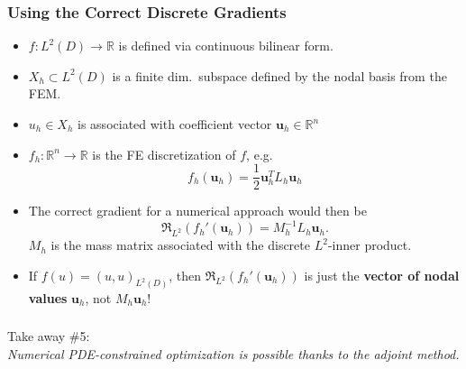 \documentclass[aspectratio=169,xcolor=dvipsnames,10pt]{beamer}
\begin{document}
\begin{frame}\frametitle{Using the Correct Discrete Gradients}
\vspace{-2ex}
\begin{example}[]
\begin{itemize}
\item
$f : L^2(D) \to \mathbb R$  is defined via continuous bilinear form.
\item 
$X_h \subset L^2(D)$ is a finite dim.\ subspace defined by the nodal basis from the FEM. 
\item 
$u_h \in X_h$ is associated with coefficient vector $\mathbf{u}_h \in \mathbb R^n$ \pause
\item 
$f_h : \mathbb R^n \to \mathbb R$ is the FE discretization of $f$, e.g.
\[
f_h(\mathbf{u}_h) = \frac{1}{2} \mathbf{u}^T_h L_h \mathbf{u}_h
\]
\item The correct gradient for a numerical approach would then be
\[
\mathfrak{R}_{L^2}(f_h'(\mathbf{u}_h)) = M_h^{-1} L_h \mathbf{u}_h.
\]
$M_h$ is the mass matrix associated with the discrete $L^2$-inner product.
\item If $f(u) = (u,u)_{L^2(D)}$, then $\mathfrak{R}_{L^2}(f_h'(\mathbf{u}_h))$ is just the \textbf{vector of nodal values} $\bm u_h$, \alert{not} $M_h \bm u_h$!
\end{itemize}
\end{example}
\end{frame}

\begin{frame}\frametitle{}
\begin{center}\Large
Take away \#5:\\
\textit{Numerical PDE-constrained optimization is possible thanks to the \alert{adjoint method}.}
\end{center}
\end{frame}
\end{document}
